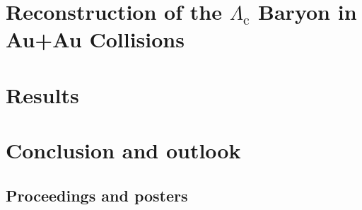 \documentclass[a4paper,titlepage,11pt]{book} %
\newcommand{\Listofabbrev}{
                           \printnomenclature
                           \newpage
                          }
\begin{document}
\chapter{Reconstruction of the $\Lambda_\text{c}$ Baryon in Au+Au Collisions}


\chapter{Results}


\chapter{Conclusion and outlook} \label{conclusion}



 \cleardoublepage

\Listofabbrev \newpage

\cleardoublepage


\begin{appendices}
\chapter{Proceedings and posters}

\end{appendices}
\end{document}
